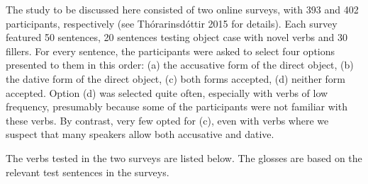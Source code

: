 \begin{styleStandard}
The study to be discussed here consisted of two online surveys, with 393 and 402 participants, respectively (see Thórarinsdóttir 2015 for details). Each survey featured 50 sentences, 20 sentences testing object case with novel verbs and 30 fillers. For every sentence, the participants were asked to select four options presented to them in this order: (a) the accusative form of the direct object, (b) the dative form of the direct object, (c) both forms accepted, (d) neither form accepted. Option (d) was selected quite often, especially with verbs of low frequency, presumably because some of the participants were not familiar with these verbs. By contrast, very few opted for (c), even with verbs where we suspect that many speakers allow both accusative and dative.
\end{styleStandard}

\begin{styleStandard}
The verbs tested in the two surveys are listed below. The glosses are based on the relevant test sentences in the surveys. 
\end{styleStandard}

